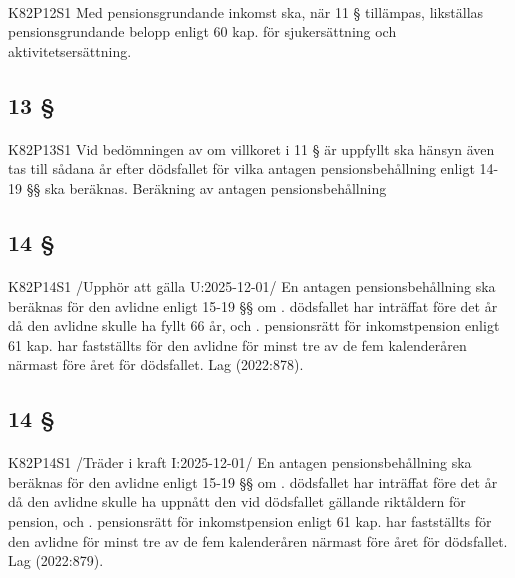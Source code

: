 \documentclass[a4paper,notitlepage,openany,10pt]{book}
\begin{document}
\paragraph*{}
{\tiny K82P12S1}
Med pensionsgrundande inkomst ska, när 11 § tillämpas, likställas pensionsgrundande belopp enligt 60 kap. för sjukersättning och aktivitetsersättning.
\subsection*{13 §}
\paragraph*{}
{\tiny K82P13S1}
Vid bedömningen av om villkoret i 11 § är uppfyllt ska hänsyn även tas till sådana år efter dödsfallet för vilka antagen pensionsbehållning enligt 14-19 §§ ska beräknas.
Beräkning av antagen pensionsbehållning
\subsection*{14 §}
\paragraph*{}
{\tiny K82P14S1}
/Upphör att gälla U:2025-12-01/
En antagen pensionsbehållning ska beräknas för den avlidne enligt 15-19 §§ om
. dödsfallet har inträffat före det år då den avlidne skulle ha fyllt 66 år, och
. pensionsrätt för inkomstpension enligt 61 kap. har fastställts för den avlidne för minst tre av de fem kalenderåren närmast före året för dödsfallet.
Lag (2022:878).
\subsection*{14 §}
\paragraph*{}
{\tiny K82P14S1}
/Träder i kraft I:2025-12-01/
En antagen pensionsbehållning ska beräknas för den avlidne enligt 15-19 §§ om
. dödsfallet har inträffat före det år då den avlidne skulle ha uppnått den vid dödsfallet gällande riktåldern för pension, och
. pensionsrätt för inkomstpension enligt 61 kap. har fastställts för den avlidne för minst tre av de fem kalenderåren närmast före året för dödsfallet.
Lag (2022:879).
\end{document}
